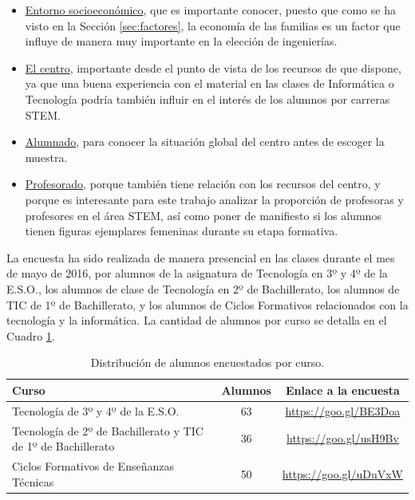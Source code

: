 \documentclass[runningheads,a4paper]{llncs}
\begin{document}
\begin{itemize}
  \item \underline{Entorno socioeconómico}, que es importante conocer, puesto que como se ha visto en la Sección \ref{sec:factores}, la economía de las familias es un factor que influye de manera muy importante en la elección de ingenierías.
  \item \underline{El centro}, importante desde el punto de vista de los recursos de que dispone, ya que una buena experiencia con el material en las clases de Informática o Tecnología podría también influir en el interés de los alumnos por carreras STEM.
  \item \underline{Alumnado}, para conocer la situación global del centro antes de escoger la muestra.
  \item \underline{Profesorado}, porque también tiene relación con los recursos del centro, y porque es interesante para este trabajo analizar la proporción de profesoras y profesores en el área STEM, así como poner de manifiesto si los alumnos tienen figuras ejemplares femeninas durante su etapa formativa.
\end{itemize}

La encuesta ha sido realizada de manera presencial en las clases durante el mes de mayo de 2016, por alumnos de la asignatura de Tecnología en 3º y 4º de la E.S.O., los alumnos de clase de Tecnología en 2º de Bachillerato, los alumnos de TIC de 1º de Bachillerato, y los alumnos de Ciclos Formativos relacionados con la tecnología y la informática. La cantidad de alumnos por curso se detalla en el Cuadro \ref{tab:muestra}.

\begin{table}
  \caption{{\scriptsize Distribución de alumnos encuestados por curso.}}
  \label{tab:muestra}

  \begin{center}
    \begin{tabular}{|m{6cm}|c|c|}
    \hline
      {\small Curso} & {\small Alumnos} & {\small Enlace a la encuesta} \\ \hline
      {\small Tecnología de 3º y 4º de la E.S.O.} & {\small 63} & {\small \url{https://goo.gl/BE3Doa}} \\ \hline
      {\small Tecnología de 2º de Bachillerato y TIC de 1º de Bachillerato} & {\small 36} & {\small \url{https://goo.gl/usH9Bv}} \\ \hline
      {\small Ciclos Formativos de Enseñanzas Técnicas} & {\small 50} & {\small \url{https://goo.gl/uDuVxW}} \\ \hline
    \end{tabular}
  \end{center}
\end{table}
\end{document}
